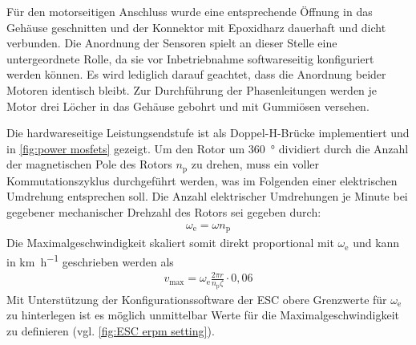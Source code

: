 	Für den motorseitigen Anschluss wurde eine entsprechende Öffnung in das Gehäuse geschnitten und der Konnektor mit Epoxidharz dauerhaft und dicht verbunden.
	Die Anordnung der Sensoren spielt an dieser Stelle eine untergeordnete Rolle, da sie vor Inbetriebnahme softwareseitig konfiguriert werden können.
	Es wird lediglich darauf geachtet, dass die Anordnung beider Motoren identisch bleibt.
	Zur Durchführung der Phasenleitungen werden je Motor drei Löcher in das Gehäuse gebohrt und mit Gummiösen versehen.\par\medskip
	Die hardwareseitige Leistungsendstufe ist als Doppel-H-Brücke implementiert und in \cref{fig:power mosfets} gezeigt.
	Um den Rotor um \qty{360}{\degree} dividiert durch die Anzahl der magnetischen Pole des Rotors \(n_\text{p}\) zu drehen, muss ein voller Kommutationszyklus durchgeführt werden, was im Folgenden einer elektrischen Umdrehung entsprechen soll.
	Die Anzahl elektrischer Umdrehungen je Minute bei gegebener mechanischer Drehzahl des Rotors sei gegeben durch:
	\begin{align}
		\omega_\text{e} = \omega n_\text{p}
		\label{eq:ERPM and RPM}
	\end{align}
	Die Maximalgeschwindigkeit skaliert somit direkt proportional mit \(\omega_\text{e}\) und kann in \unit{\kilo\metre\per\hour} geschrieben werden als
	\begin{align}
		v_\text{max} = \omega_\text{e} \frac{2\pi r}{n_\text{p} \zeta} \cdot 0,06
		\label{eq:max speed by ERPM}
	\end{align}
	Mit Unterstützung der Konfigurationssoftware der ESC obere Grenzwerte für \(\omega_\text{e}\) zu hinterlegen ist es möglich unmittelbar Werte für die Maximalgeschwindigkeit zu definieren (vgl. \cref{fig:ESC erpm setting}).